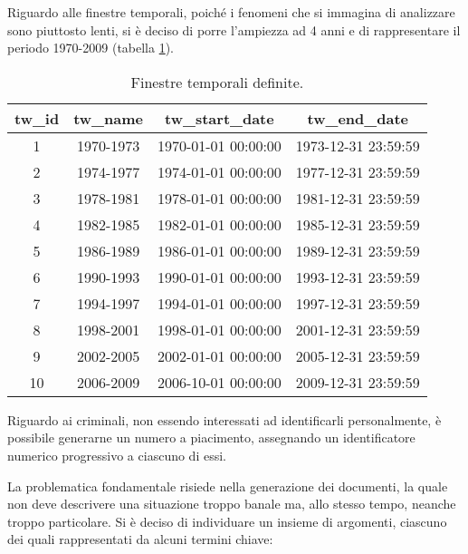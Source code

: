 Riguardo alle finestre temporali, poiché i fenomeni che si immagina di analizzare sono piuttosto lenti, si è deciso di porre l'ampiezza ad 4 anni e di rappresentare il periodo 1970-2009 (tabella \ref{TAB_FinestreTemporali}).
\begin{table}[htb]
	\centering
	\footnotesize
	\begin{tabular}{|cccc|}
	\hline
	\textbf{tw\_id} & \textbf{tw\_name} & \textbf{tw\_start\_date} & \textbf{tw\_end\_date} \\ \hline
	1 & 1970-1973 & 1970-01-01 00:00:00 & 1973-12-31 23:59:59 \\
	2 & 1974-1977 & 1974-01-01 00:00:00 & 1977-12-31 23:59:59 \\
	3 & 1978-1981 & 1978-01-01 00:00:00 & 1981-12-31 23:59:59 \\
	4 & 1982-1985 & 1982-01-01 00:00:00 & 1985-12-31 23:59:59 \\
	5 & 1986-1989 & 1986-01-01 00:00:00 & 1989-12-31 23:59:59 \\
	6 & 1990-1993 & 1990-01-01 00:00:00 & 1993-12-31 23:59:59 \\
	7 & 1994-1997 & 1994-01-01 00:00:00 & 1997-12-31 23:59:59 \\
	8 & 1998-2001 & 1998-01-01 00:00:00 & 2001-12-31 23:59:59 \\
	9 & 2002-2005 & 2002-01-01 00:00:00 & 2005-12-31 23:59:59 \\
	10 & 2006-2009 & 2006-10-01 00:00:00 & 2009-12-31 23:59:59 \\
	\hline
	\end{tabular}
	\caption{Finestre temporali definite.}
	\label{TAB_FinestreTemporali}
\end{table}

Riguardo ai criminali, non essendo interessati ad identificarli personalmente, è possibile generarne un numero a piacimento, assegnando un identificatore numerico progressivo a ciascuno di essi.

La problematica fondamentale risiede nella generazione dei documenti, la quale non deve descrivere una situazione troppo banale ma, allo stesso tempo, neanche troppo particolare. Si è deciso di individuare un insieme di argomenti, ciascuno dei quali rappresentati da alcuni termini chiave:


